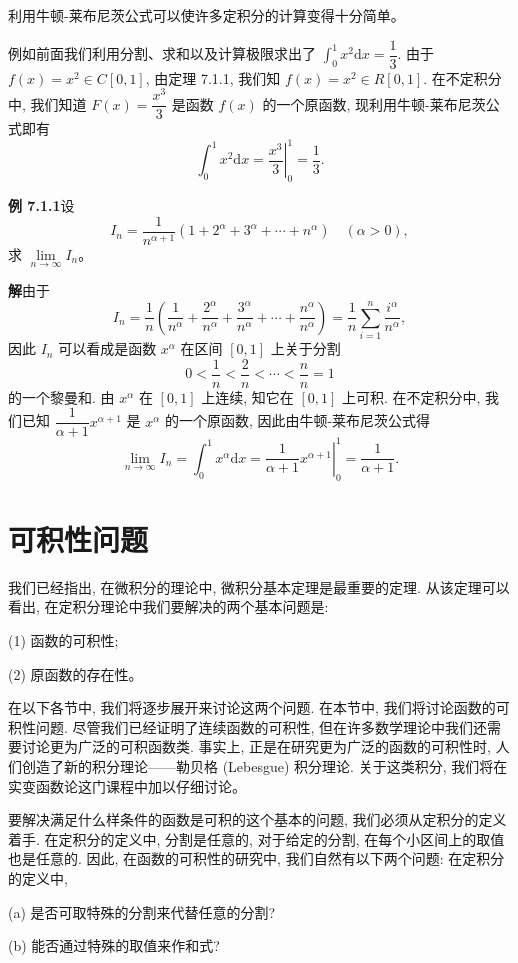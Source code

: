 \documentclass[UTF8, 12pt, fontset=fandol, oneside]{ctexart}
\begin{document}
利用牛顿-莱布尼茨公式可以使许多定积分的计算变得十分简单。

例如前面我们利用分割、求和以及计算极限求出了 $\int_0^1x^2\mathrm dx=\dfrac13$. 由于 $f(x)=x^2\in C[0,1]$, 由定理 7.1.1, 我们知 $f(x)=x^2\in R[0,1]$. 在不定积分中, 我们知道 $F(x)=\dfrac{x^3}{3}$ 是函数 $f(x)$ 的一个原函数, 现利用牛顿-莱布尼茨公式即有
\[
  \int_0^1 x^2\mathrm dx=\left.\frac{x^3}{3}\right|_0^1=\frac13.
\]

\noindent\textbf{例 7.1.1}\quad 设
\[
  I_n=\frac1{n^{\alpha+1}}(1+2^\alpha+3^\alpha+\cdots+n^\alpha)\quad(\alpha>0),
\]
求 $\lim\limits_{n\to\infty}I_n$。

\noindent\textbf{解}\quad 由于
\[
  I_n=\frac1n\left(\frac1{n^\alpha}+\frac{2^\alpha}{n^\alpha}+\frac{3^\alpha}{n^\alpha}+\cdots+\frac{n^\alpha}{n^\alpha}\right)
  =\frac1n\sum_{i=1}^n\frac{i^\alpha}{n^\alpha},
\]
因此 $I_n$ 可以看成是函数 $x^\alpha$ 在区间 $[0,1]$ 上关于分割
\[
  0<\frac1n<\frac2n<\cdots<\frac nn=1
\]
的一个黎曼和. 由 $x^\alpha$ 在 $[0,1]$ 上连续, 知它在 $[0,1]$ 上可积. 在不定积分中, 我们已知 $\dfrac1{\alpha+1}x^{\alpha+1}$ 是 $x^\alpha$ 的一个原函数, 因此由牛顿-莱布尼茨公式得
\[
  \lim_{n\to\infty}I_n=\int_0^1 x^\alpha\mathrm dx
  =\left.\frac1{\alpha+1}x^{\alpha+1}\right|_0^1
  =\frac1{\alpha+1}.
\]

\section{可积性问题}

我们已经指出, 在微积分的理论中, 微积分基本定理是最重要的定理. 从该定理可以看出, 在定积分理论中我们要解决的两个基本问题是:

(1) 函数的可积性;

(2) 原函数的存在性。

在以下各节中, 我们将逐步展开来讨论这两个问题. 在本节中, 我们将讨论函数的可积性问题. 尽管我们已经证明了连续函数的可积性, 但在许多数学理论中我们还需要讨论更为广泛的可积函数类. 事实上, 正是在研究更为广泛的函数的可积性时, 人们创造了新的积分理论——勒贝格 (Lebesgue) 积分理论. 关于这类积分, 我们将在实变函数论这门课程中加以仔细讨论。

要解决满足什么样条件的函数是可积的这个基本的问题, 我们必须从定积分的定义着手. 在定积分的定义中, 分割是任意的, 对于给定的分割, 在每个小区间上的取值也是任意的. 因此, 在函数的可积性的研究中, 我们自然有以下两个问题: 在定积分的定义中,

(a) 是否可取特殊的分割来代替任意的分割?

(b) 能否通过特殊的取值来作和式?
\end{document}
